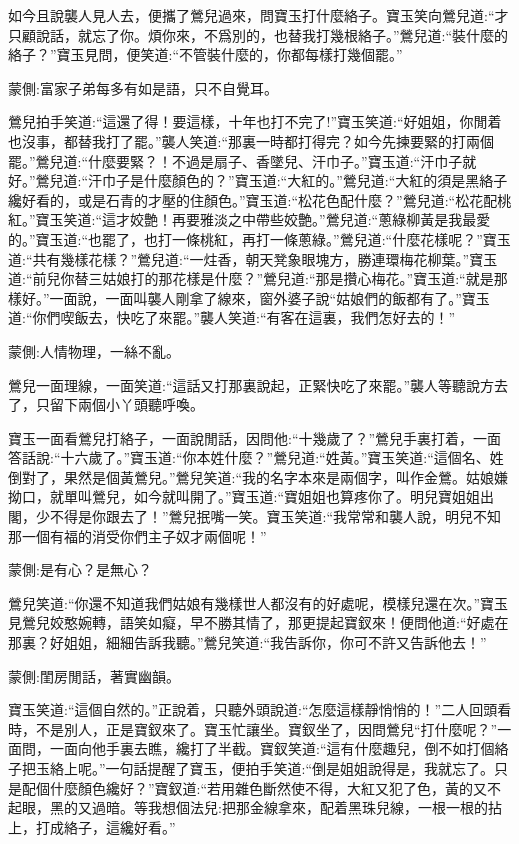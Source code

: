 \begin{parag}
    如今且說襲人見人去，便攜了鶯兒過來，問寶玉打什麼絡子。寶玉笑向鶯兒道:“才只顧說話，就忘了你。煩你來，不爲別的，也替我打幾根絡子。”鶯兒道:“裝什麼的絡子？”寶玉見問，便笑道:“不管裝什麼的，你都每樣打幾個罷。”\begin{note}蒙側:富家子弟每多有如是語，只不自覺耳。\end{note}鶯兒拍手笑道:“這還了得！要這樣，十年也打不完了!”寶玉笑道:“好姐姐，你閒着也沒事，都替我打了罷。”襲人笑道:“那裏一時都打得完？如今先揀要緊的打兩個罷。”鶯兒道:“什麼要緊？！不過是扇子、香墜兒、汗巾子。”寶玉道:“汗巾子就好。”鶯兒道:“汗巾子是什麼顏色的？”寶玉道:“大紅的。”鶯兒道:“大紅的須是黑絡子纔好看的，或是石青的才壓的住顏色。”寶玉道:“松花色配什麼？”鶯兒道:“松花配桃紅。”寶玉笑道:“這才姣艶！再要雅淡之中帶些姣艶。”鶯兒道:“蔥綠柳黃是我最愛的。”寶玉道:“也罷了，也打一條桃紅，再打一條蔥綠。”鶯兒道:“什麼花樣呢？”寶玉道:“共有幾樣花樣？”鶯兒道:“一炷香，朝天凳象眼塊方，勝連環梅花柳葉。”寶玉道:“前兒你替三姑娘打的那花樣是什麼？”鶯兒道:“那是攢心梅花。”寶玉道:“就是那樣好。”一面說，一面叫襲人剛拿了線來，窗外婆子說“姑娘們的飯都有了。”寶玉道:“你們喫飯去，快吃了來罷。”襲人笑道:“有客在這裏，我們怎好去的！”\begin{note}蒙側:人情物理，一絲不亂。\end{note}鶯兒一面理線，一面笑道:“這話又打那裏說起，正緊快吃了來罷。”襲人等聽說方去了，只留下兩個小丫頭聽呼喚。
\end{parag}


\begin{parag}
    寶玉一面看鶯兒打絡子，一面說閒話，因問他:“十幾歲了？”鶯兒手裏打着，一面答話說:“十六歲了。”寶玉道:“你本姓什麼？”鶯兒道:“姓黃。”寶玉笑道:“這個名、姓倒對了，果然是個黃鶯兒。”鶯兒笑道:“我的名字本來是兩個字，叫作金鶯。姑娘嫌拗口，就單叫鶯兒，如今就叫開了。”寶玉道:“寶姐姐也算疼你了。明兒寶姐姐出閣，少不得是你跟去了！”鶯兒抿嘴一笑。寶玉笑道:“我常常和襲人說，明兒不知那一個有福的消受你們主子奴才兩個呢！”\begin{note}蒙側:是有心？是無心？\end{note}鶯兒笑道:“你還不知道我們姑娘有幾樣世人都沒有的好處呢，模樣兒還在次。”寶玉見鶯兒姣憨婉轉，語笑如癡，早不勝其情了，那更提起寶釵來！便問他道:“好處在那裏？好姐姐，細細告訴我聽。”鶯兒笑道:“我告訴你，你可不許又告訴他去！”\begin{note}蒙側:閨房閒話，著實幽韻。\end{note}寶玉笑道:“這個自然的。”正說着，只聽外頭說道:“怎麼這樣靜悄悄的！”二人回頭看時，不是別人，正是寶釵來了。寶玉忙讓坐。寶釵坐了，因問鶯兒“打什麼呢？”一面問，一面向他手裏去瞧，纔打了半截。寶釵笑道:“這有什麼趣兒，倒不如打個絡子把玉絡上呢。”一句話提醒了寶玉，便拍手笑道:“倒是姐姐說得是，我就忘了。只是配個什麼顏色纔好？”寶釵道:“若用雜色斷然使不得，大紅又犯了色，黃的又不起眼，黑的又過暗。等我想個法兒:把那金線拿來，配着黑珠兒線，一根一根的拈上，打成絡子，這纔好看。”
\end{parag}


